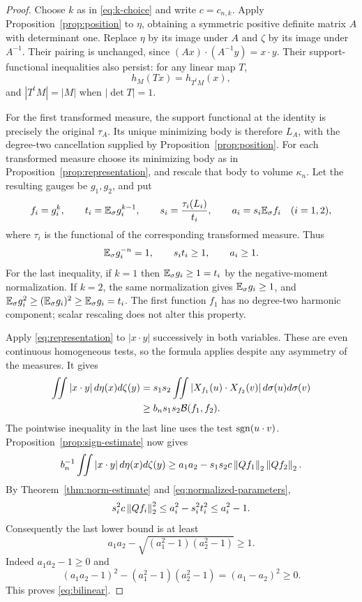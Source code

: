 \begin{proof}
Choose $k$ as in \eqref{eq:k-choice} and write $c=c_{n,k}$.
Apply Proposition~\ref{prop:position} to $\eta$, obtaining a symmetric
positive definite matrix $A$ with determinant one.
Replace $\eta$ by its image under $A$ and $\zeta$ by its image under
$A^{-1}$. Their pairing is unchanged, since
$(Ax)\cdot(A^{-1}y)=x\cdot y$.
Their support-functional inequalities also persist: for any linear map
$T$,
\[
 h_M(Tx)=h_{T^tM}(x),
\]
and $|T^tM|=|M|$ when $|\det T|=1$.

For the first transformed measure, the support functional at the
identity is precisely the original $\tau_A$. Its unique minimizing
body is therefore $L_A$, with the degree-two cancellation supplied by
Proposition~\ref{prop:position}.
For each transformed measure choose its minimizing body as in
Proposition~\ref{prop:representation}, and rescale that body to volume
$\kappa_n$. Let the resulting gauges be $g_1,g_2$, and put
\[
 f_i=g_i^k,\qquad t_i=\mathbb E_{\sigma} g_i^{k-1},\qquad
 s_i=\frac{\tau_i(L_i)}{t_i},\qquad
 a_i=s_i\mathbb E_{\sigma} f_i\quad(i=1,2),
\]
where $\tau_i$ is the functional of the corresponding transformed
measure. Thus
\begin{equation}\label{eq:normalized-parameters}
 \mathbb E_{\sigma} g_i^{-n}=1,\qquad s_it_i\ge1,\qquad a_i\ge1.
\end{equation}
For the last inequality, if $k=1$ then $\mathbb E_{\sigma} g_i\ge1=t_i$ by the
negative-moment normalization. If $k=2$, the same normalization gives
$\mathbb E_{\sigma} g_i\ge1$, and $\mathbb E_{\sigma} g_i^2\ge(\mathbb E_{\sigma} g_i)^2\ge\mathbb E_{\sigma} g_i=t_i$.
The first function $f_1$ has no degree-two harmonic component; scalar
rescaling does not alter this property.

Apply \eqref{eq:representation} to $|x\cdot y|$ successively in both
variables. These are even continuous homogeneous tests, so the formula
applies despite any asymmetry of the measures. It gives
\begin{align}
 \iint |x\cdot y|\,d\eta(x)d\zeta(y)
 &=s_1s_2\iint
       |X_{f_1}(u)\cdot X_{f_2}(v)|\,d\sigma(u)d\sigma(v)
       \notag\\
 &\ge b_ns_1s_2\mathcal B(f_1,f_2).
 \label{eq:pairing-sign}
\end{align}
The pointwise inequality in the last line uses the test
$\operatorname{sgn}(u\cdot v)$. Proposition~\ref{prop:sign-estimate} now gives
\[
 b_n^{-1}\iint |x\cdot y|\,d\eta(x)d\zeta(y)
 \ge a_1a_2-s_1s_2c\left\lVert Qf_1\right\rVert_2\left\lVert Qf_2\right\rVert_2.
\]
By Theorem~\ref{thm:norm-estimate} and
\eqref{eq:normalized-parameters},
\begin{equation}\label{eq:error-absorption}
 s_i^2c\left\lVert Qf_i\right\rVert_2^2
 \le a_i^2-s_i^2t_i^2\le a_i^2-1.
\end{equation}
Consequently the last lower bound is at least
\[
 a_1a_2-\sqrt{(a_1^2-1)(a_2^2-1)}\ge1.
\]
Indeed $a_1a_2-1\ge0$ and
\[
 (a_1a_2-1)^2-(a_1^2-1)(a_2^2-1)=(a_1-a_2)^2\ge0.
\]
This proves \eqref{eq:bilinear}.


\end{proof}
